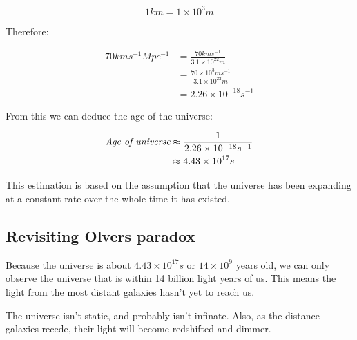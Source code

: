 \documentclass{article}
\begin{document}
\[
	1km = 1\times10^{3}m
\]

Therefore:

\[
	\begin{split}
		70kms^{-1}Mpc^{-1} &= \frac{70kms^{-1}}{3.1\times10^{22}m}\\
						   &= \frac{70\times10^{3}ms^{-1}}{3.1\times10^{22}m}\\
						   &= 2.26\times10^{-18}s^{-1}
	\end{split}
\]

From this we can deduce the age of the universe:

\[
	\begin{split}
	\textrm{\it Age of universe} &\approx \frac{1}{2.26\times10^{-18}s^{-1}}\\
								 &\approx 4.43\times10^{17}s
	\end{split}
\]

This estimation is based on the assumption that the universe has been expanding
at a constant rate over the whole time it has existed.

\subsection{Revisiting Olvers paradox}

Because the universe is about $4.43\times10^{17}s$ or $14\times10^9$ years old,
we can only observe the universe that is within 14 billion light years of us.
This means the light from the most distant galaxies hasn't yet to reach us.

The universe isn't static, and probably isn't infinate. Also, as the distance
galaxies recede, their light will become redshifted and dimmer.
\end{document}
